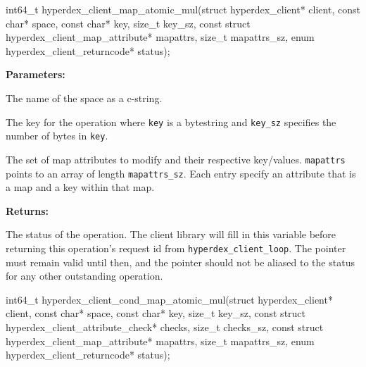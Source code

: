 \funcsep
{}
\begin{ccode}
int64_t hyperdex_client_map_atomic_mul(struct hyperdex_client* client,
                const char* space,
                const char* key, size_t key_sz,
                const struct hyperdex_client_map_attribute* mapattrs, size_t mapattrs_sz,
                enum hyperdex_client_returncode* status);
\end{ccode}
\funcdesc 

\noindent\textbf{Parameters:}
\begin{description}[labelindent=\widthof{{\texttt{mapattrs}, \texttt{mapattrs\_sz}}},leftmargin=*,noitemsep,nolistsep,align=right]
\item[\texttt{space}] The name of the space as a c-string.
\item[\texttt{key}, \texttt{key\_sz}] The key for the operation where \texttt{key} is a bytestring and \texttt{key\_sz} specifies the number of bytes in \texttt{key}.
\item[\texttt{mapattrs}, \texttt{mapattrs\_sz}] The set of map attributes to modify and their respective key/values.  \texttt{mapattrs} points to an array of length \texttt{mapattrs\_sz}.  Each entry specify an attribute that is a map and a key within that map.
\end{description}

\noindent\textbf{Returns:}
\begin{description}[labelindent=\widthof{{\texttt{status}}},leftmargin=*,noitemsep,nolistsep,align=right]
\item[\texttt{status}] The status of the operation.  The client library will fill in this variable before returning this operation's request id from \texttt{hyperdex\_client\_loop}.  The pointer must remain valid until then, and the pointer should not be aliased to the status for any other outstanding operation.
\end{description}

\funcsep
{}
\begin{ccode}
int64_t hyperdex_client_cond_map_atomic_mul(struct hyperdex_client* client,
                const char* space,
                const char* key, size_t key_sz,
                const struct hyperdex_client_attribute_check* checks, size_t checks_sz,
                const struct hyperdex_client_map_attribute* mapattrs, size_t mapattrs_sz,
                enum hyperdex_client_returncode* status);
\end{ccode}
\funcdesc 

